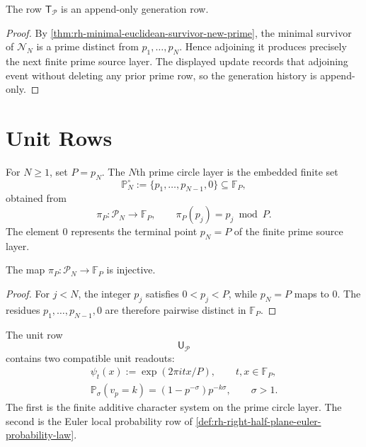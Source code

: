\begin{theorem}
\label{thm:rh-prime-object-time-row-append-only}
The row $\mathsf T_{\mathcal P}$ is an append-only generation row.
\end{theorem}

\begin{proof}
By
\autoref{thm:rh-minimal-euclidean-survivor-new-prime}, the minimal
survivor of $\mathcal N_N$ is a prime distinct from
$p_1,\ldots,p_N$.  Hence adjoining it produces precisely the next
finite prime source layer.  The displayed update records that adjoining
event without deleting any prior prime row, so the generation history
is append-only.
\end{proof}

\section{Unit Rows}
\label{sec:rh-all-prime-object-unit-rows}

\begin{definition}
\label{def:rh-prime-circle-layer}
For $N\ge1$, set $P=p_N$.  The $N$th prime circle layer is the embedded
finite set
$$
\mathbb P_N^\circ
:=
\{p_1,\ldots,p_{N-1},0\}
\subseteq
\mathbb F_P,
$$
obtained from
$$
\pi_P:\mathcal P_N\to\mathbb F_P,
\qquad
\pi_P(p_j)=p_j\bmod P.
$$
The element $0$ represents the terminal point $p_N=P$ of the finite
prime source layer.
\end{definition}

\begin{lemma}
\label{lem:rh-prime-circle-embedding}
The map $\pi_P:\mathcal P_N\to\mathbb F_P$ is injective.
\end{lemma}

\begin{proof}
For $j<N$, the integer $p_j$ satisfies $0<p_j<P$, while $p_N=P$ maps to
$0$.  The residues $p_1,\ldots,p_{N-1},0$ are therefore pairwise
distinct in $\mathbb F_P$.
\end{proof}

\begin{definition}
\label{def:rh-prime-object-unit-row}
The unit row
$$
\mathsf U_{\mathcal P}
$$
contains two compatible unit readouts:
$$
\begin{gathered}
\psi_t(x):=\exp(2\pi i tx/P),
\qquad t,x\in\mathbb F_P,\\
\mathbb P_{\sigma}(v_p=k)=(1-p^{-\sigma})p^{-k\sigma},
\qquad \sigma>1.
\end{gathered}
$$
The first is the finite additive character system on the prime circle
layer.  The second is the Euler local probability row of
\autoref{def:rh-right-half-plane-euler-probability-law}.
\end{definition}

